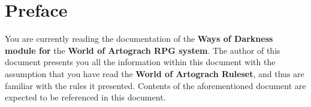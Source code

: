 \documentclass[openany,10pt,a4paper]{book}
\begin{document}
\newcommand{\FeatII}[5]{\begin{tabularx}{0.75\textwidth}{c @{\extracolsep{\fill}} c}
\hline
\multicolumn{2}{|c|}{{#3}} \\ \hline
\multicolumn{1}{|c}{\resizebox{.2\linewidth}{!}{{#4}}} & \multicolumn{1}{c}{\resizebox{.2\linewidth}{!}{{#5}}} \\ \hline
\multicolumn{1}{|c}{{#1}}        & \multicolumn{1}{c}{{#2}}  \\ \hline
\end{tabularx}}
\newcommand{\FeatIII}[7]{\begin{tabularx}{0.75\textwidth}{c @{\extracolsep{\fill}} cc}
\hline
\multicolumn{3}{|c|}{{#4}} \\ \hline
\multicolumn{1}{|c}{\resizebox{.2\linewidth}{!}{{#5}}} & \multicolumn{1}{c}{\resizebox{.2\linewidth}{!}{{#6}}} & \multicolumn{1}{c|}{\resizebox{.2\linewidth}{!}{{#7}}} \\ \hline
\multicolumn{1}{|c}{{#1}}        & \multicolumn{1}{c}{{#2}}       & \multicolumn{1}{c|}{{#3}}       \\ \hline
\end{tabularx}}

\maketitle
\tableofcontents
\chapter*{Preface}
You are currently reading the documentation of the \textbf{Ways of Darkness module for} the \textbf{World of Artograch RPG system}. The author of this document presents you all the information within this document with the assumption that you have read the \textbf{World of Artograch Ruleset}, and thus are familiar with the rules it presented. Contents of the aforementioned document are expected to be referenced in this document.
\end{document}
